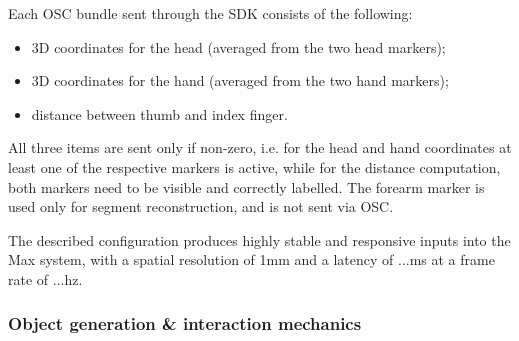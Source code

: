 \documentclass{nime-alternate}
\begin{document}
Each OSC bundle sent through the SDK consists of the following:
\begin{itemize}
	\item 3D coordinates for the head (averaged from the two head markers);
	\item 3D coordinates for the hand (averaged from the two hand markers);
	\item distance between thumb and index finger.
\end{itemize}

All three items are sent only if non-zero, i.e. for the head and hand coordinates at least one of the respective markers is active, while for the distance computation, both markers need to be visible and correctly labelled. The forearm marker is used only for segment reconstruction, and is not sent via OSC.



The described configuration produces highly stable and responsive inputs into the Max system, with a spatial resolution of 1mm and a latency of ...ms at a frame rate of ...hz.

\subsubsection{Object generation \& interaction mechanics}
\end{document}
